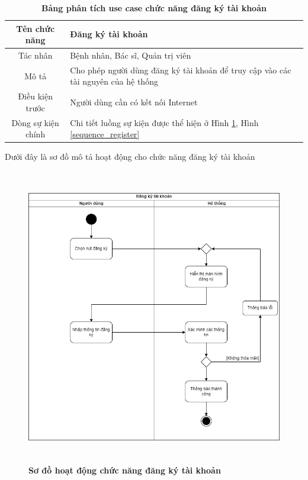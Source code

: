   \begin{table}[H]
    \caption{\bfseries \fontsize{12pt}{0pt}\selectfont Bảng phân tích use case chức năng đăng ký tài khoản}
    \centering
    \begin{tabularx}{0.9\textwidth}{|c|X|}
      \hline
      \textbf{Tên chức năng} & \textbf{Đăng ký tài khoản} \\
      \hline
      Tác nhân & Bệnh nhân, Bác sĩ, Quản trị viên \\
      \hline
      Mô tả & Cho phép người dùng đăng ký tài khoản để truy cập vào các tài nguyên của hệ thống 
       \\
      \hline
      Điều kiện trước & Người dùng cần có kết nối Internet \\
      \hline
      Dòng sự kiện chính & 
        Chi tiết luồng sự kiện được thể hiện ở Hình \ref{activity_register}, Hình \ref{sequence_register} 
        \\
      \hline
    \end{tabularx}
  \end{table}
  Dưới đây là sơ đồ mô tả hoạt động cho chức năng đăng ký tài khoản
  \begin{figure}[H]
    \centering
    \includegraphics[width=13.5cm,height=13cm]{Images/acitivity/activity_register.png}
    \caption[Sơ đồ hoạt động chức năng đăng ký tài khoản]{\bfseries \fontsize{12pt}{0pt}
    \selectfont Sơ đồ hoạt động chức năng đăng ký tài khoản}
    \label{activity_register} %
  \end{figure}

